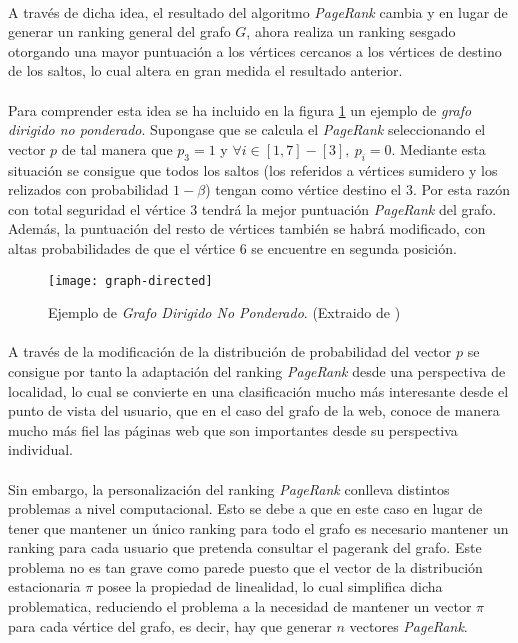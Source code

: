\documentclass{subfiles}
\begin{document}
      \paragraph{}
      A través de dicha idea, el resultado del algoritmo \emph{PageRank} cambia y en lugar de generar un ranking general del grafo $G$, ahora realiza un ranking sesgado otorgando una mayor puntuación a los vértices cercanos a los vértices de destino de los saltos, lo cual altera en gran medida el resultado anterior.


      \paragraph{}
      Para comprender esta idea se ha incluido en la figura \ref{img:directed_graph_example} un ejemplo de \emph{grafo dirigido no ponderado}. Supongase que se calcula el \emph{PageRank} seleccionando el vector $p$ de tal manera que $p_3 =1$ y $\forall i \in [1,7] - [3], \ p_i = 0$. Mediante esta situación se consigue que todos los saltos (los referidos a vértices sumidero y los relizados con probabilidad $1-\beta$) tengan como vértice destino el $3$. Por esta razón con total seguridad el vértice $3$ tendrá la mejor puntuación \emph{PageRank} del grafo. Además, la puntuación del resto de vértices también se habrá modificado, con altas probabilidades de que el vértice $6$ se encuentre en segunda posición.

      \begin{figure}
        \centering
        \texttt{[image: graph-directed]}
        \caption{Ejemplo de \emph{Grafo Dirigido No Ponderado}. (Extraido de \cite{freedman2010graphs})}
        \label{img:directed_graph_example}
      \end{figure}

      \paragraph{}
      A través de la modificación de la distribución de probabilidad del vector $p$ se consigue por tanto la adaptación del ranking \emph{PageRank} desde una perspectiva de localidad, lo cual se convierte en una clasificación mucho más interesante desde el punto de vista del usuario, que en el caso del grafo de la web, conoce de manera mucho más fiel las páginas web que son importantes desde su perspectiva individual.

      \paragraph{}
      Sin embargo, la personalización del ranking \emph{PageRank} conlleva distintos problemas a nivel computacional. Esto se debe a que en este caso en lugar de tener que mantener un único ranking para todo el grafo es necesario mantener un ranking para cada usuario que pretenda consultar el pagerank del grafo. Este problema no es tan grave como parede puesto que el vector de la distribución estacionaria $\pi$ posee la propiedad de linealidad, lo cual simplifica dicha problematica, reduciendo el problema a la necesidad de mantener un vector $\pi$ para cada vértice del grafo, es decir, hay que generar $n$ vectores \emph{PageRank}.
\end{document}
